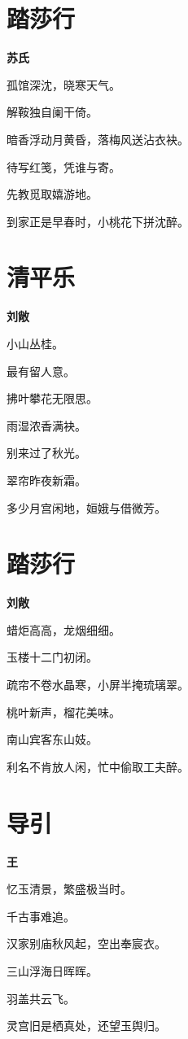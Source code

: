\documentclass[12pt,a4paper]{ctexbook}
\begin{document}
\section{踏莎行}
\textbf{苏氏}\par\vspace{0.5em}
孤馆深沈，晓寒天气。\par
解鞍独自阑干倚。\par
暗香浮动月黄昏，落梅风送沾衣袂。\par
待写红笺，凭谁与寄。\par
先教觅取嬉游地。\par
到家正是早春时，小桃花下拼沈醉。\par

\section{清平乐}
\textbf{刘敞}\par\vspace{0.5em}
小山丛桂。\par
最有留人意。\par
拂叶攀花无限思。\par
雨湿浓香满袂。\par
别来过了秋光。\par
翠帘昨夜新霜。\par
多少月宫闲地，姮娥与借微芳。\par

\section{踏莎行}
\textbf{刘敞}\par\vspace{0.5em}
蜡炬高高，龙烟细细。\par
玉楼十二门初闭。\par
疏帘不卷水晶寒，小屏半掩琉璃翠。\par
桃叶新声，榴花美味。\par
南山宾客东山妓。\par
利名不肯放人闲，忙中偷取工夫醉。\par

\section{导引}
\textbf{王}\par\vspace{0.5em}
忆玉清景，繁盛极当时。\par
千古事难追。\par
汉家别庙秋风起，空出奉宸衣。\par
三山浮海日晖晖。\par
羽盖共云飞。\par
灵宫旧是栖真处，还望玉舆归。\par
\end{document}
